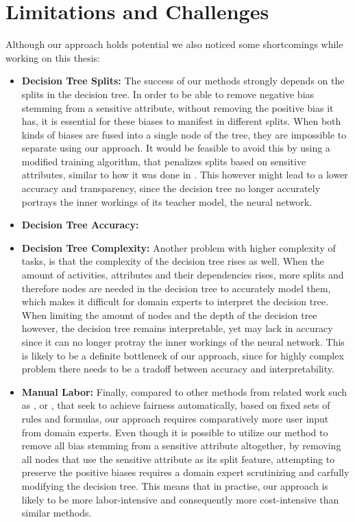\section{Limitations and Challenges}
\label{sec:limitations}
Although our approach holds potential
we also noticed some shortcomings
while working on this thesis:
\begin{itemize}
    \item \textbf{Decision Tree Splits:}
        The success of our methods strongly depends on the splits in the decision tree.
        In order to be able to remove negative bias stemming from a sensitive attribute,
        without removing the positive bias it has,
        it is essential for these biases to manifest in different splits.
        When both kinds of biases are fused into a single node of the tree,
        they are impossible to separate using our approach.
        It would be feasible to avoid this by using a modified training algorithm,
        that penalizes splits based on sensitive attributes,
        similar to how it was done in \cite{fairness_decision_tree}.
        This however might lead to a lower accuracy and transparency,
        since the decision tree no longer accurately portrays the inner workings of its teacher model,
        the neural network.
    \item \textbf{Decision Tree Accuracy:}

    \item \textbf{Decision Tree Complexity:}
        Another problem with higher complexity of tasks,
        is that the complexity of the decision tree rises as well.
        When the amount of activities, attributes and their dependencies rises,
        more splits and therefore nodes are needed in the decision tree to accurately model them,
        which makes it difficult for domain experts to interpret the decision tree.
        When limiting the amount of nodes and the depth of the decision tree however,
        the decision tree remains interpretable, yet may lack in accuracy since it can no
        longer protray the inner workings of the neural network.
        This is likely to be a definite bottleneck of our approach,
        since for highly complex problem there needs to be a tradoff between accuracy and interpretability.
    \item \textbf{Manual Labor:}
        Finally, compared to other methods from related work such as \cite{fairness_foundation}, \cite{fairness_adversarial}
        or \cite{fairness_independence}, that seek to achieve fairness automatically,
        based on fixed sets of rules and formulas,
        our approach requires comparatively more user input from domain experts.
        Even though it is possible to utilize our method to remove all bias stemming from a sensitive attribute altogether,
        by removing all nodes that use the sensitive attribute as its split feature,
        attempting to preserve the positive biases requires a domain expert scrutinizing and carfully modifying the decision tree.
        This means that in practise,
        our approach is likely to be more labor-intensive and consequently more cost-intensive than similar methods.
\end{itemize}

